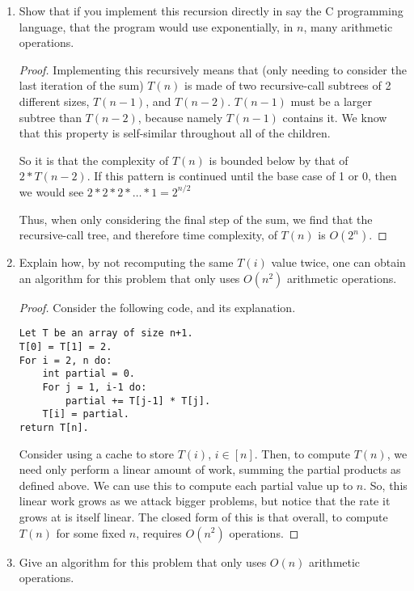 \documentclass{article}
\begin{document}
	\begin{enumerate}[label=(\alph*)]
		\item Show that if you implement this recursion directly in say the C programming language, that the
		program would use exponentially, in $n$, many arithmetic operations.

		
		\begin{proof}
			Implementing this recursively means that (only needing to consider the last iteration of the sum) $T(n)$ is made of two recursive-call subtrees of 2 different sizes, $T(n-1)$, and $T(n-2)$.
			$T(n-1)$ must be a larger subtree than $T(n-2)$, because namely $T(n-1)$ contains it.
			We know that this property is self-similar throughout all of the children.

			So it is that the complexity of $T(n)$ is bounded below by that of $2*T(n-2)$.
			If this pattern is continued until the base case of 1 or 0, then we would see $2*2*2*\dots*1 = 2^{n/2}$
			
			Thus, when only considering the final step of the sum, we find that the recursive-call tree, and therefore time complexity, of $T(n)$ is $O(2^n)$.
		\end{proof}
	
		\item Explain how, by not recomputing the same $T(i)$ value twice, one can obtain an algorithm for this
		problem that only uses $O(n^2)$ arithmetic operations.
		
		\begin{proof}
			Consider the following code, and its explanation.
			\begin{lstlisting}
Let T be an array of size n+1.
T[0] = T[1] = 2.
For i = 2, n do:
	int partial = 0.
	For j = 1, i-1 do:
		partial += T[j-1] * T[j].
	T[i] = partial.
return T[n].
			\end{lstlisting}
			Consider using a cache to store $T(i)$, $i\in [n]$.
			Then, to compute $T(n)$, we need only perform a linear amount of work, summing the partial products as defined above.
			We can use this to compute each partial value up to $n$.
			So, this linear work grows as we attack bigger problems, but notice that the rate it grows at is itself linear.
			The closed form of this is that overall, to compute $T(n)$ for some fixed $n$, requires $O(n^2)$ operations.
		\end{proof}
		
		\item Give an algorithm for this problem that only uses $O(n)$ arithmetic operations.
		

\end{enumerate}
\end{document}
